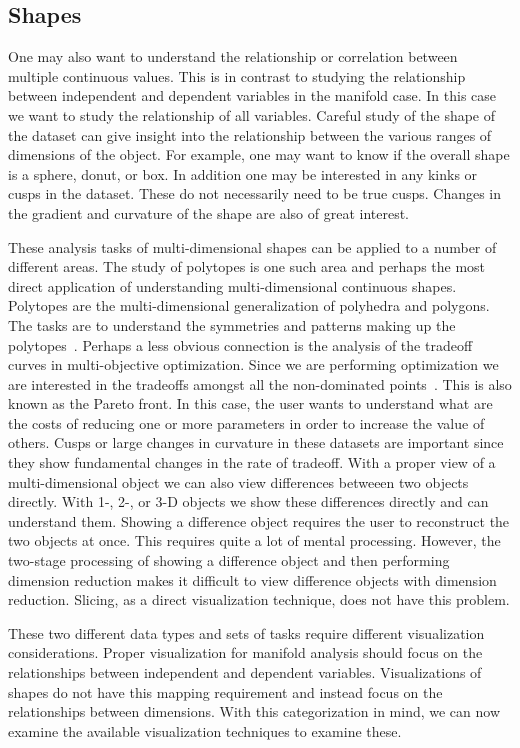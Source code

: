 \subsection{Shapes}
\label{sec:shapes}

One may also want to understand the relationship or correlation between
multiple continuous values. This is in contrast to studying the relationship
between independent and dependent variables in the manifold case. In this case
we want to study the relationship of all variables. Careful study of the shape
of the dataset can give insight into the relationship between the various
ranges of dimensions of the object. For example, one may want to know if the
overall shape is a sphere, donut, or box. In addition one may be interested in
any kinks or cusps in the dataset.  These do not necessarily need
to be true cusps. Changes in the gradient and curvature of the shape are also
of great interest.

These analysis tasks of multi-dimensional shapes can be applied to a number of
different areas. The study of polytopes is one such area and perhaps the most
direct application of understanding multi-dimensional continuous shapes.
Polytopes are the multi-dimensional generalization of polyhedra and polygons.
The tasks are to understand the symmetries and patterns making up the
polytopes~\cite{Ziegler:2012}. Perhaps a less obvious connection is the
analysis of the tradeoff curves in multi-objective optimization. Since we are
performing optimization we are interested in the tradeoffs amongst all the
non-dominated points~\cite{Kung:1975}. This is also known as the Pareto
front. In this case, the user wants to understand what are the costs of
reducing one or more parameters in order to increase the value of others. Cusps
or large changes in curvature in these datasets are important since they show
fundamental changes in the rate of tradeoff.  With a proper view of a
multi-dimensional object we can also view differences betweeen two objects
directly. With 1-, 2-, or 3-D objects we show these differences directly and
can understand them.  Showing a difference object requires the user to reconstruct
the two objects at once. This requires quite a lot of mental processing.
However, the two-stage processing of showing a difference object and then
performing dimension reduction makes it difficult to view difference objects
with dimension reduction. Slicing, as a direct visualization technique, does
not have this problem. 

These two different data types and sets of tasks require different visualization
considerations. Proper visualization for manifold analysis should focus on
the relationships between independent and dependent variables. Visualizations
of shapes do not have this mapping requirement and instead focus on the 
relationships between dimensions. With this categorization in mind, we can now
examine the available visualization techniques to examine these.

